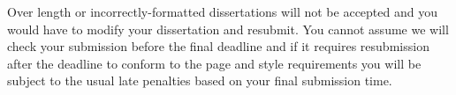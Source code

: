\documentclass[bsc,frontabs,singlespacing,parskip,deptreport]{infthesis}
\begin{document}
Over length or incorrectly-formatted dissertations will not be accepted and you
would have to modify your dissertation and resubmit. You cannot assume we will
check your submission before the final deadline and if it requires resubmission
after the deadline to conform to the page and style requirements you will be
subject to the usual late penalties based on your final submission time.




%
%
%
\end{document}
